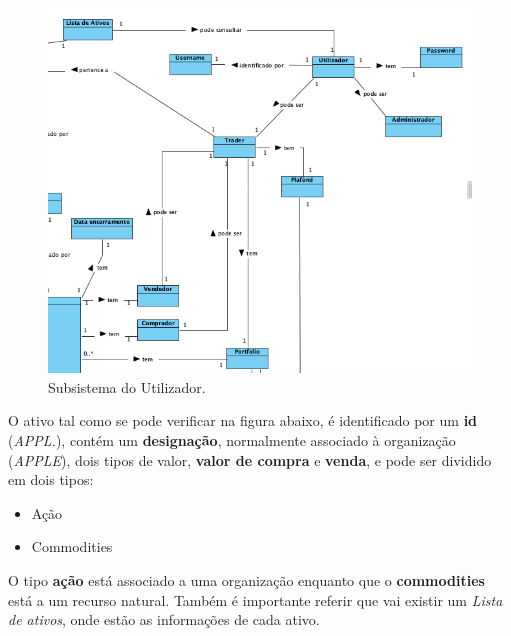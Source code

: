 \documentclass[11pt,a4paper]{report}%
\begin{document}
\begin{figure}[H]
	\centering
	\includegraphics[scale=0.6]{modelo-dominio-1.png}
	\caption{Subsistema do Utilizador. }
	\label{img:pag}
\end{figure}

\newpage

O ativo tal como se pode verificar na figura abaixo, é identificado por um \textbf{id} (\emph{APPL.}), contém um \textbf{designação}, normalmente associado à organização (\emph{APPLE}), dois tipos de valor, \textbf{valor de compra} e \textbf{venda}, e pode ser dividido em dois tipos:

\begin{itemize}
    \item Ação
    \item Commodities
\end{itemize}{}

O tipo \textbf{ação} está associado a uma organização enquanto que o \textbf{commodities} está a um recurso natural. Também é importante referir que vai existir um \emph{Lista de ativos}, onde estão as informações de cada ativo.
\end{document}
